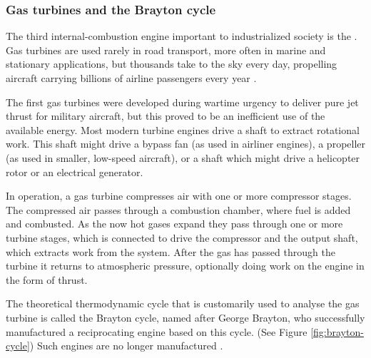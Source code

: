 \subsubsection{Gas turbines and the Brayton cycle}

The third internal\hyp{}combustion engine important to industrialized society is
the . Gas turbines are used rarely in road transport, more
often in marine and stationary applications, but thousands take to the sky every
day, propelling aircraft carrying billions of airline passengers every year
\autocite{Morris2017}.

The first gas turbines were developed during wartime urgency to deliver pure jet
thrust for military aircraft, but this proved to be an inefficient use of the
available energy. Most modern turbine engines drive a shaft to extract
rotational work. This shaft might drive a bypass fan (as used in airliner engines), a
propeller (as used in smaller, low-speed aircraft), or a shaft which might drive
a helicopter rotor or an electrical generator.

In operation, a gas turbine compresses air with one or more compressor stages.
The compressed air passes through a combustion chamber, where fuel is added and
combusted. As the now hot gases expand they pass through one or more turbine
stages, which is connected to drive the compressor and the output shaft, which
extracts work from the system. After the gas has passed through the turbine it
returns to atmospheric pressure, optionally doing work on the engine in the form
of thrust.

The theoretical thermodynamic cycle that is customarily used to analyse the gas
turbine is called the Brayton cycle, named after George Brayton, who
successfully manufactured a reciprocating engine based on this cycle. (See
Figure \ref{fig:brayton-cycle}) Such engines are no longer manufactured
\autocite[Chapter 10]{Cummins1989}.

